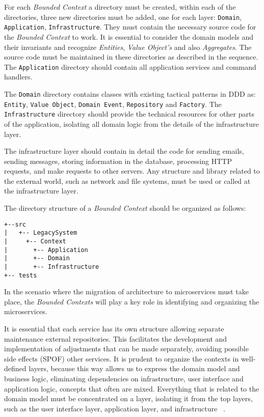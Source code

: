 \documentclass[a4paper,twoside]{article}
\begin{document}
For each \textit{Bounded Context} a directory must be created, within each of the directories, three new directories must be added, one for each layer: \texttt{Domain}, \texttt{Application}, \texttt{Infrastructure}. They must contain the necessary source code for the \textit{Bounded Context} to work. It is essential to consider the domain models and their invariants and recognize \textit{Entities}, \textit{Value Object's} and also \textit{Aggregates}. The source code must be maintained in these directories as described in the sequence. The \texttt{Application} directory should contain all application services and command handlers.

The \texttt{Domain} directory contains classes with existing tactical patterns in DDD as: \texttt{Entity}, \texttt{Value Object}, \texttt {Domain Event}, \texttt{Repository} and \texttt{Factory}. The \texttt{Infrastructure} directory should provide the technical resources for other parts of the application, isolating all domain logic from the details of the infrastructure layer.

The infrastructure layer should contain in detail the code for sending emails, sending messages, storing information in the database, processing HTTP requests, and make requests to other servers. Any structure and library related to the external world, such as network and file systems, must be used or called at the infrastructure layer.

The directory structure of a \textit{Bounded Context} should be organized as follows:

\begin{verbatim}
+--src
|   +-- LegacySystem
|     +-- Context
|       +-- Application
|       +-- Domain
|       +-- Infrastructure
+-- tests
\end{verbatim}

In the scenario where the migration of architecture to microservices must take place, the \textit{Bounded Contexts} will play a key role in identifying and organizing the microservices.

It is essential that each service has its own structure allowing separate maintenance external repositories. This facilitates the development and implementation of adjustments that can be made separately, avoiding possible side effects (SPOF) other services. It is prudent to organize the contexts in well-defined layers, because this way allows us to express the domain model and business logic, eliminating dependencies on infrastructure, user interface and application logic, concepts that often are mixed. Everything that is related to the domain model must be concentrated on a layer, isolating it from the top layers, such as the user interface layer, application layer, and infrastructure ~\cite{evans2004domain}. \\
\end{document}
